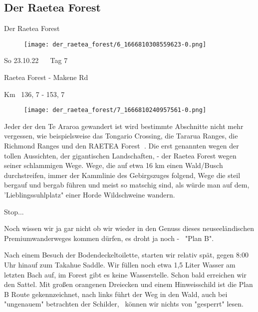 \subsection{Der Raetea Forest}

Der Raetea Forest


\begin{figure}[H]
	\centering
	\texttt{[image: der\_raetea\_forest/6\_1666810308559623-0.png]}
	\caption{}
	\label{fig:6_1666810308559623-0}
\end{figure}

   So 23.10.22    Tag 7
  


   Raetea Forest - Makene Rd
  


  Km  136, 7 - 153, 7
 


\begin{figure}[H]
	\centering
	\texttt{[image: der\_raetea\_forest/7\_1666810240957561-0.png]}
	\caption{}
	\label{fig:7_1666810240957561-0}
\end{figure}

  Jeder der den Te Araroa gewandert ist wird bestimmte Abschnitte nicht mehr vergessen, wie beispielsweise das Tongario Crossing, die Tararua Ranges, die Richmond Ranges und den RAETEA Forest 🥶. Die erst genannten wegen der tollen Aussichten, der gigantischen Landschaften, - der Raetea Forest wegen seiner schlammigen Wege. Wege, die auf etwa 16 km einen Wald/Busch durchstreifen, immer der Kammlinie des Gebirgszuges folgend, Wege die steil bergauf und bergab führen und meist so matschig sind, als würde man auf dem, 'Lieblingssuhlplatz" einer Horde Wildschweine wandern.
 


  Stop...
 


  Noch wissen wir ja gar nicht ob wir wieder in den Genuss dieses neuseeländischen Premiumwanderweges kommen dürfen, es droht ja noch -  "Plan B".
 


  Nach einem Besuch der Bodendeckeltoilette, starten wir relativ spät, gegen 8:00 Uhr hinauf zum Takahue Saddle. Wir füllen noch etwa 1,5 Liter Wasser am letzten Bach auf, im Forest gibt es keine Wasserstelle. Schon bald erreichen wir den Sattel. Mit großen orangenen Dreiecken und einem Hinweisschild ist die Plan B Route gekennzeichnet, nach links führt der Weg in den Wald, auch bei "ungenauem" betrachten der Schilder,  können wir nichts von "gesperrt" lesen.
 


